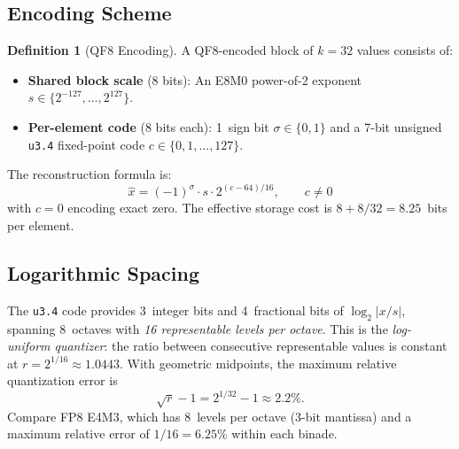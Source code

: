 \documentclass[11pt,letterpaper]{article}
\theoremstyle{definition}
\newtheorem{definition}[theorem]{Definition}
\theoremstyle{remark}
\begin{document}
\subsection{Encoding Scheme}

\begin{definition}[QF8 Encoding]
\label{def:qf8-encoding}
A QF8-encoded block of $k = 32$ values consists of:
\begin{itemize}[leftmargin=2em]
  \item \textbf{Shared block scale} (8 bits): An E8M0 power-of-2 exponent
    $s \in \{2^{-127}, \ldots, 2^{127}\}$.
  \item \textbf{Per-element code} (8 bits each): 1~sign bit
    $\sigma \in \{0,1\}$ and a 7-bit unsigned \texttt{u3.4} fixed-point code
    $c \in \{0, 1, \ldots, 127\}$.
\end{itemize}
The reconstruction formula is:
\[
  \hat{x} = (-1)^\sigma \cdot s \cdot 2^{(c - 64)/16}, \qquad c \neq 0
\]
with $c = 0$ encoding exact zero.
The effective storage cost is $8 + 8/32 = 8.25$~bits per element.
\end{definition}

\subsection{Logarithmic Spacing}

The \texttt{u3.4} code provides 3~integer bits and 4~fractional bits of
$\log_2|x/s|$, spanning 8~octaves with \emph{16 representable levels per
octave}.
This is the \emph{log-uniform quantizer}: the ratio between consecutive
representable values is constant at $r = 2^{1/16} \approx 1.0443$.
With geometric midpoints, the maximum relative quantization error is
\[
  \sqrt{r} - 1 = 2^{1/32} - 1 \approx 2.2\%.
\]
Compare FP8 E4M3, which has 8~levels per octave (3-bit mantissa) and a maximum
relative error of $1/16 = 6.25\%$ within each binade.
\end{document}
